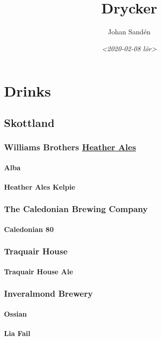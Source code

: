 \documentclass[11pt]{article}
\author{Johan Sandén}
\date{\textit{<2020-02-08 lör>}}
\title{Drycker}
\begin{document}
\maketitle
\tableofcontents

\section{Drinks}
\label{sec:org782bb2f}
\subsection{Skottland}
\label{sec:orgb2951bc}
\subsubsection{Williams Brothers \underline{Heather Ales}}
\label{sec:org0e6a5b8}
\paragraph{Alba}
\label{sec:org7c75ec2}
\paragraph{Heather Ales Kelpie}
\label{sec:org26b01b4}
\subsubsection{The Caledonian Brewing Company}
\label{sec:org18d6fbc}
\paragraph{Caledonian 80}
\label{sec:org5b9ff6a}
\subsubsection{Traquair House}
\label{sec:orgc735662}
\paragraph{Traquair House Ale}
\label{sec:org8ffd2e1}
\subsubsection{Inveralmond Brewery}
\label{sec:org3ddc8b2}
\paragraph{Ossian}
\label{sec:orgfbc191d}
\paragraph{Lia Fail}
\label{sec:orgcb62fa3}
\end{document}
